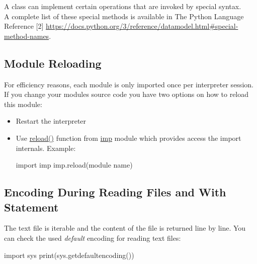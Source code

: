 \documentclass[
]{article}
\newenvironment{Shaded}{}{}
\newcommand{\BuiltInTok}[1]{#1}
\newcommand{\ImportTok}[1]{#1}
\newcommand{\NormalTok}[1]{#1}
\begin{document}
A class can implement certain operations that are invoked by special
syntax.\\
A complete list of these special methods is available in The Python
Language Reference {[}2{]}
\url{https://docs.python.org/3/reference/datamodel.html\#special-method-names}.

\hypertarget{module-reloading}{%
\subsection{Module Reloading}\label{module-reloading}}

For efficiency reasons, each module is only imported once per
interpreter session. If you change your modules source code you have two
options on how to reload this module:

\begin{itemize}
\item
  Restart the interpreter
\item
  Use
  \href{https://docs.python.org/3/library/imp.html?highlight=reload\#imp.reload}{reload()}
  function from \href{https://docs.python.org/3/library/imp.html}{imp}
  module which provides access the import internals. Example:

\begin{Shaded}
\begin{Highlighting}[]
\ImportTok{import}\NormalTok{ imp}
\NormalTok{imp.}\BuiltInTok{reload}\NormalTok{(module name)}
\end{Highlighting}
\end{Shaded}
\end{itemize}

\hypertarget{encoding-during-reading-files-and-with-statement}{%
\subsection{Encoding During Reading Files and With
Statement}\label{encoding-during-reading-files-and-with-statement}}

The text file is iterable and the content of the file is returned line
by line. You can check the used \emph{default} encoding for reading text
files:

\begin{Shaded}
\begin{Highlighting}[]
\ImportTok{import}\NormalTok{ sys }
\BuiltInTok{print}\NormalTok{(sys.getdefaultencoding())}
\end{Highlighting}
\end{Shaded}
\end{document}

